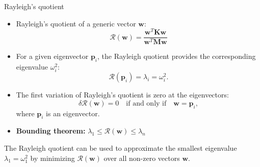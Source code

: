 \documentclass[aspectratio=169]{beamer}
\begin{document}
{\begin{frame}{Rayleigh's quotient}
  \small
  \begin{itemize}
    \item Rayleigh's quotient of a generic vector $\mathbf w$:
          \[
            \mathcal R(\mathbf w) = \frac{\mathbf w^T \mathbf K \mathbf w}{\mathbf w^T \mathbf M \mathbf w}
          \]
    \item For a given eigenvector \( \mathbf{p}_i  \), the Rayleigh quotient provides the corresponding eigenvalue \( \omega_i^2 \):$$\mathcal R(\mathbf p_i) = \lambda_i= \omega_i^2.$$
    \item The first variation of Rayleigh's quotient is zero at the eigenvectors:
          \[
            \delta \mathcal{R}(\mathbf{w}) = 0 \quad \text{if and only if} \quad \mathbf{w} = \mathbf{p}_i,
          \]
          where \(\mathbf{p}_i\) is an eigenvector.
    \item \textbf{Bounding theorem:}
          \vspace{0.2cm}
          \(
          \lambda_1 \leq \mathcal{R}(\mathbf{w}) \leq \lambda_n
          \)
  \end{itemize}
  \begin{tcolorbox}[colback=darkred!10,colframe=darkred!40!black]
    The Rayleigh quotient can be used to approximate the smallest eigenvalue \( \lambda_1 = \omega_1^2 \) by minimizing \( \mathcal R(\mathbf w) \) over all non-zero vectors \( \mathbf w \).
  \end{tcolorbox}
\end{frame}


}
\end{document}
